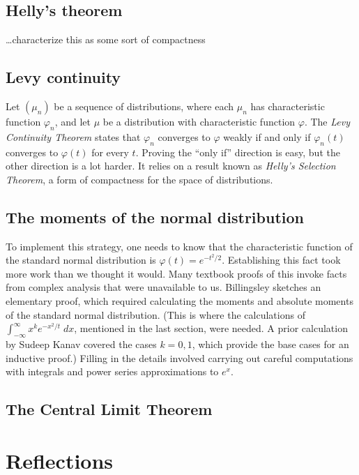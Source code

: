 \documentclass{svjour3}
\newcommand{\todo}[1]{{\color{red}#1}}
\newcommand{\ph}{\varphi}
\begin{document}
\subsection{Helly's theorem}

\todo{
\ldots characterize this as some sort of compactness

}

\subsection{Levy continuity}

\todo{
Let $(\mu_n)$ be a sequence of distributions, where each $\mu_n$ has characteristic function $\ph_n$, and let $\mu$ be a distribution with characteristic function $\ph$. The \emph{Levy Continuity Theorem} states that $\ph_n$ converges to $\ph$ weakly if and only if $\ph_n(t)$ converges to $\ph(t)$ for every $t$. Proving the ``only if'' direction is easy, but the other direction is a lot harder. It relies on a result known as \emph{Helly's Selection Theorem}, a form of compactness for the space of distributions.
}

\subsection{The moments of the normal distribution}

\todo{
To implement this strategy, one needs to know that the characteristic function of the standard normal distribution is $\ph(t) = e^{-t^2/2}$. Establishing this fact took more work than we thought it would. Many textbook proofs of this invoke facts from complex analysis that were unavailable to us. Billingsley \cite[page 344]{billingsley:95} sketches an elementary proof, which required calculating the moments and absolute moments of the standard normal distribution. (This is where the calculations of $\int_{-\infty}^\infty x^k e^{-x^2 / t} \; dx$, mentioned in the last section, were needed. A prior calculation by Sudeep Kanav covered the cases $k = 0, 1$, which provide the base cases for an inductive proof.) Filling in the details involved carrying out careful computations with integrals and power series approximations to $e^x$.
}

\subsection{The Central Limit Theorem}


\section{Reflections}
\label{section:reflections}
\end{document}
